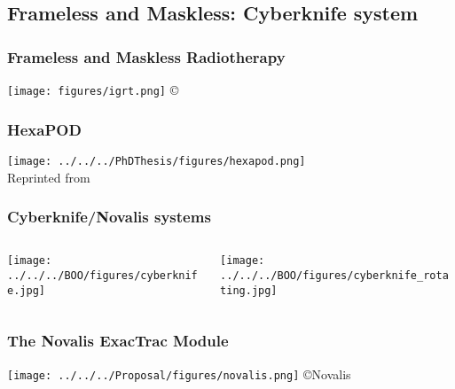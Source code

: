 \subsection{Frameless and Maskless: Cyberknife system}
\begin{frame}
\frametitle{Frameless and Maskless Radiotherapy}
\texttt{[image: figures/igrt.png]}
\centering \copyright ~\cite{Wiersma09Dev}
\end{frame}

\begin{frame}
\frametitle{HexaPOD}
\centering 
\texttt{[image: ../../../PhDThesis/figures/hexapod.png]} \\
\centering Reprinted from \cite{HerrmannHexaPODMPC}
\end{frame}

\begin{frame}
\frametitle{Cyberknife/Novalis systems}
\begin{columns}[c]
	\begin{column}{0.5\textwidth}
		\centering				
		\texttt{[image: ../../../BOO/figures/cyberknife.jpg]}
	\end{column}
	\begin{column}{0.5\textwidth}
		\centering				
		\texttt{[image: ../../../BOO/figures/cyberknife\_rotating.jpg]}
	\end{column}
\end{columns}
\end{frame}
%
\begin{frame}
\frametitle{The Novalis ExacTrac Module}
\centering %
\texttt{[image: ../../../Proposal/figures/novalis.png]}
\centering \copyright Novalis
\end{frame}

